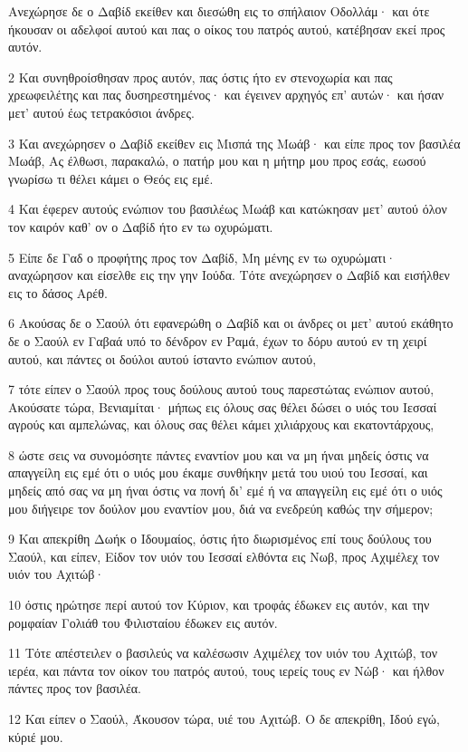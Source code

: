 \par Ανεχώρησε δε ο Δαβίδ εκείθεν και διεσώθη εις το σπήλαιον Οδολλάμ· και ότε ήκουσαν οι αδελφοί αυτού και πας ο οίκος του πατρός αυτού, κατέβησαν εκεί προς αυτόν.
\par 2 Και συνηθροίσθησαν προς αυτόν, πας όστις ήτο εν στενοχωρία και πας χρεωφειλέτης και πας δυσηρεστημένος· και έγεινεν αρχηγός επ' αυτών· και ήσαν μετ' αυτού έως τετρακόσιοι άνδρες.
\par 3 Και ανεχώρησεν ο Δαβίδ εκείθεν εις Μισπά της Μωάβ· και είπε προς τον βασιλέα Μωάβ, Ας έλθωσι, παρακαλώ, ο πατήρ μου και η μήτηρ μου προς εσάς, εωσού γνωρίσω τι θέλει κάμει ο Θεός εις εμέ.
\par 4 Και έφερεν αυτούς ενώπιον του βασιλέως Μωάβ και κατώκησαν μετ' αυτού όλον τον καιρόν καθ' ον ο Δαβίδ ήτο εν τω οχυρώματι.
\par 5 Είπε δε Γαδ ο προφήτης προς τον Δαβίδ, Μη μένης εν τω οχυρώματι· αναχώρησον και είσελθε εις την γην Ιούδα. Τότε ανεχώρησεν ο Δαβίδ και εισήλθεν εις το δάσος Αρέθ.
\par 6 Ακούσας δε ο Σαούλ ότι εφανερώθη ο Δαβίδ και οι άνδρες οι μετ' αυτού εκάθητο δε ο Σαούλ εν Γαβαά υπό το δένδρον εν Ραμά, έχων το δόρυ αυτού εν τη χειρί αυτού, και πάντες οι δούλοι αυτού ίσταντο ενώπιον αυτού,
\par 7 τότε είπεν ο Σαούλ προς τους δούλους αυτού τους παρεστώτας ενώπιον αυτού, Ακούσατε τώρα, Βενιαμίται· μήπως εις όλους σας θέλει δώσει ο υιός του Ιεσσαί αγρούς και αμπελώνας, και όλους σας θέλει κάμει χιλιάρχους και εκατοντάρχους,
\par 8 ώστε σεις να συνομόσητε πάντες εναντίον μου και να μη ήναι μηδείς όστις να απαγγείλη εις εμέ ότι ο υιός μου έκαμε συνθήκην μετά του υιού του Ιεσσαί, και μηδείς από σας να μη ήναι όστις να πονή δι' εμέ ή να απαγγείλη εις εμέ ότι ο υιός μου διήγειρε τον δούλον μου εναντίον μου, διά να ενεδρεύη καθώς την σήμερον;
\par 9 Και απεκρίθη Δωήκ ο Ιδουμαίος, όστις ήτο διωρισμένος επί τους δούλους του Σαούλ, και είπεν, Είδον τον υιόν του Ιεσσαί ελθόντα εις Νωβ, προς Αχιμέλεχ τον υιόν του Αχιτώβ·
\par 10 όστις ηρώτησε περί αυτού τον Κύριον, και τροφάς έδωκεν εις αυτόν, και την ρομφαίαν Γολιάθ του Φιλισταίου έδωκεν εις αυτόν.
\par 11 Τότε απέστειλεν ο βασιλεύς να καλέσωσιν Αχιμέλεχ τον υιόν του Αχιτώβ, τον ιερέα, και πάντα τον οίκον του πατρός αυτού, τους ιερείς τους εν Νώβ· και ήλθον πάντες προς τον βασιλέα.
\par 12 Και είπεν ο Σαούλ, Άκουσον τώρα, υιέ του Αχιτώβ. Ο δε απεκρίθη, Ιδού εγώ, κύριέ μου.
